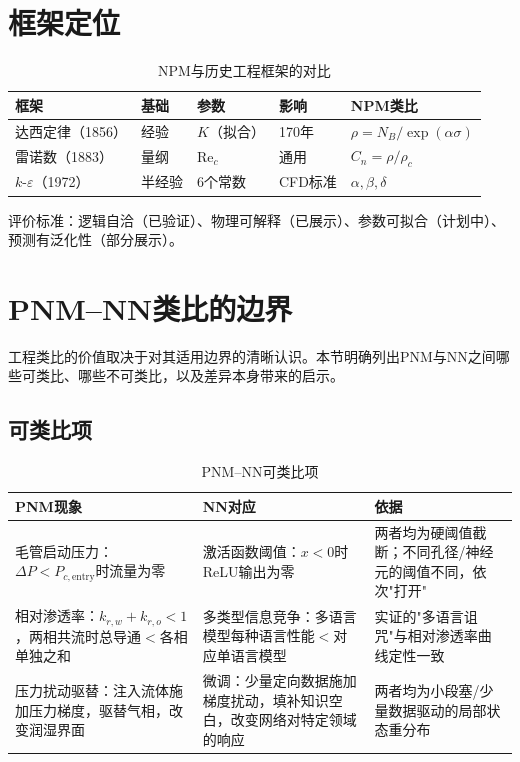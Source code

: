 \documentclass[11pt,a4paper]{article}
\newcommand{\rhoc}{\rho_c}
\begin{document}
\section{框架定位}

\begin{table}[ht]
\centering
\caption{NPM与历史工程框架的对比}
\small
\begin{tabular}{p{3cm}lllp{3cm}}
\toprule
\textbf{框架} & \textbf{基础} & \textbf{参数} & \textbf{影响} & \textbf{NPM类比} \\
\midrule
达西定律（1856）& 经验 & $K$（拟合）& 170年 & $\rho=N_B/\exp(\alpha\sigma)$ \\
雷诺数（1883） & 量纲 & $\text{Re}_c$ & 通用 & $C_n=\rho/\rhoc$ \\
$k$-$\varepsilon$（1972）& 半经验 & 6个常数 & CFD标准 & $\alpha,\beta,\delta$ \\
\bottomrule
\end{tabular}
\end{table}

评价标准：逻辑自洽（已验证）、物理可解释（已展示）、参数可拟合（计划中）、预测有泛化性（部分展示）。

\section{PNM–NN类比的边界}
\label{sec:analogy-boundary}

工程类比的价值取决于对其适用边界的清晰认识。本节明确列出PNM与NN之间哪些可类比、哪些不可类比，以及差异本身带来的启示。

\subsection{可类比项}

\begin{table}[H]
\centering
\caption{PNM–NN可类比项}
\small
\begin{tabular}{p{3.5cm}p{3.5cm}p{5cm}}
\toprule
\textbf{PNM现象} & \textbf{NN对应} & \textbf{依据} \\
\midrule
毛管启动压力：$\Delta P<P_{c,\text{entry}}$时流量为零 & 激活函数阈值：$x<0$时ReLU输出为零 & 两者均为硬阈值截断；不同孔径/神经元的阈值不同，依次"打开" \\
\addlinespace
相对渗透率：$k_{r,w}+k_{r,o}<1$，两相共流时总导通$<$各相单独之和 & 多类型信息竞争：多语言模型每种语言性能$<$对应单语言模型 & \citet{conneau2020multilingual}实证的"多语言诅咒"与相对渗透率曲线定性一致 \\
\addlinespace
压力扰动驱替：注入流体施加压力梯度，驱替气相，改变润湿界面 & 微调：少量定向数据施加梯度扰动，填补知识空白，改变网络对特定领域的响应 & 两者均为小段塞/少量数据驱动的局部状态重分布 \\
\bottomrule
\end{tabular}
\end{table}
\end{document}
